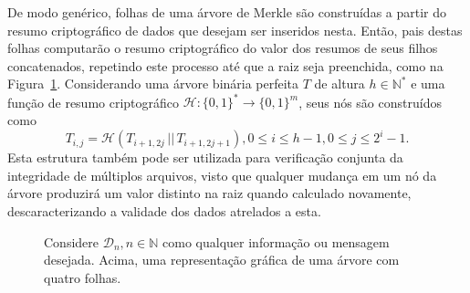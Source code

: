 \documentclass[12pt]{report}
\newcommand{\hash}[2][]{\mathcal{H}^{#1}(#2)}
\newcommand{\concat}{\, \vert \vert \,}
\newcommand{\binwds}[1]{\{0, 1\}^{#1}}
\begin{document}
De modo genérico, folhas de uma árvore de Merkle são construídas a partir do resumo criptográfico de dados que desejam ser inseridos nesta. Então, pais destas folhas computarão o resumo criptográfico do valor dos resumos de seus filhos concatenados, repetindo este processo até que a raiz seja preenchida, como na Figura~\ref{fig:4}. Considerando uma árvore binária perfeita $T$ de altura $h \in \mathbb{N}^{*}$ e uma função de resumo criptográfico $\mathcal{H} : \binwds{*} \longrightarrow \binwds{m}$, seus nós são construídos como \begin{equation}T_{i,j} = \mathcal{H}(T_{i + 1, 2j} \concat T_{i + 1, 2j + 1}), 0 \leq i \leq h - 1, 0 \leq j \leq 2^{i} - 1.\end{equation} Esta estrutura também pode ser utilizada para verificação conjunta da integridade de múltiplos arquivos, visto que qualquer mudança em um nó da árvore produzirá um valor distinto na raiz quando calculado novamente, descaracterizando a validade dos dados atrelados a esta.

\begin{figure}
    \centering
    \caption{Considere $\mathcal{D}_n, n \in \mathbb{N}$ como qualquer informação ou mensagem desejada. Acima, uma representação gráfica de uma árvore com quatro folhas.}
    \label{fig:4}
\end{figure}
\end{document}
